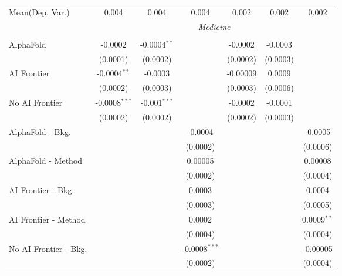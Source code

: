 \begin{tabular}{lcccccc}
Mean(Dep. Var.) & 0.004 & 0.004 & 0.004 & 0.002 & 0.002 & 0.002 \\
 & \multicolumn{6}{c}{\textit{Medicine}} \\ \\
   AlphaFold               & -0.0002         & -0.0004$^{**}$ &                 & -0.0002  & -0.0003  &   \\   
                           & (0.0001)        & (0.0002)       &                 & (0.0002) & (0.0003) &   \\   
   AI Frontier             & -0.0004$^{**}$  & -0.0003        &                 & -0.00009 & 0.0009   &   \\   
                           & (0.0002)        & (0.0003)       &                 & (0.0003) & (0.0006) &   \\   
   No AI Frontier          & -0.0008$^{***}$ & -0.001$^{***}$ &                 & -0.0002  & -0.0001  &   \\   
                           & (0.0002)        & (0.0002)       &                 & (0.0002) & (0.0003) &   \\   
   AlphaFold - Bkg.        &                 &                & -0.0004         &          &          & -0.0005\\   
                           &                 &                & (0.0002)        &          &          & (0.0006)\\   
   AlphaFold - Method      &                 &                & 0.00005         &          &          & 0.00008\\   
                           &                 &                & (0.0002)        &          &          & (0.0004)\\   
   AI Frontier - Bkg.      &                 &                & 0.0003          &          &          & 0.0004\\   
                           &                 &                & (0.0003)        &          &          & (0.0005)\\   
   AI Frontier - Method    &                 &                & 0.0002          &          &          & 0.0009$^{**}$\\   
                           &                 &                & (0.0004)        &          &          & (0.0004)\\   
   No AI Frontier - Bkg.   &                 &                & -0.0008$^{***}$ &          &          & -0.00005\\   
                           &                 &                & (0.0002)        &          &          & (0.0004)\\   

\end{tabular}
